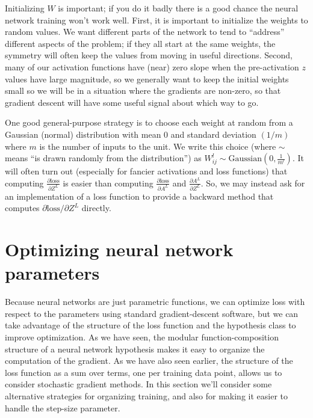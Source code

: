 Initializing $W$ is important;  if you do it badly there is a good
chance the neural network training won't work well.  First, it is
important to initialize the weights to random values.  We want
different parts of the network to tend to ``address'' different
aspects of the problem; if they all start at the same weights, the
symmetry will often keep the values from moving in useful directions.
Second, many of our activation functions have (near) zero slope when
the pre-activation $z$ values have large magnitude, so we generally
want to keep the initial weights small so we will be in a situation
where the gradients are non-zero, so that gradient descent will have
some useful signal about which way to go.

One good general-purpose strategy is to choose each weight at random
from a Gaussian (normal) distribution with mean 0 and standard
deviation $(1/m)$ where $m$ is the number of inputs to the unit.
  We write this choice (where $\sim$ means ``is drawn
randomly from the distribution'') as $W^l_{ij} \sim \text{Gaussian}\left(0,
  \frac{1}{m^l}\right).$ It will often turn out (especially for fancier activations and loss
functions) that computing
$\frac{\partial \text{loss}}{\partial Z^L}$ is easier than computing
$\frac{\partial \text{loss}}{\partial A^L}$ and $\frac{\partial A^L}{\partial Z^L}.$ So, we may instead ask for an implementation of a loss function to provide a backward method that computes $\partial \text{loss}/\partial Z^L$ directly.


\section{Optimizing neural network parameters}
\label{sec-make_nn_work}

Because neural networks are just parametric functions, we can optimize
loss with respect to the parameters using standard gradient-descent
software, but we can take advantage of the structure of the loss
function and the hypothesis class to improve optimization.  As we have
seen, the modular function-composition structure of a neural network
hypothesis makes it easy to organize the computation of the gradient.
As we have also seen earlier, the structure of the loss function as a
sum over terms, one per training data point, allows us to consider
stochastic gradient methods.  In this section we'll consider some
alternative strategies for organizing training, and also for making it
easier to handle the step-size parameter.

